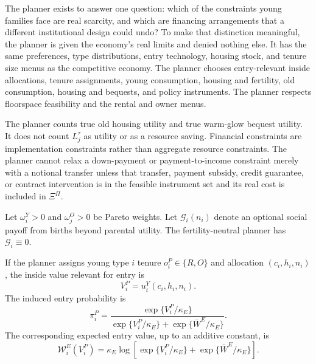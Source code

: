 \documentclass[11pt]{article}
\newcommand{\1}{\mathbf 1}
\begin{document}
The planner exists to answer one question: which of the constraints young families face are real scarcity, and which are financing arrangements that a different institutional design could undo? To make that distinction meaningful, the planner is given the economy's real limits and denied nothing else. It has the same preferences, type distributions, entry technology, housing stock, and tenure size menus as the competitive economy. The planner chooses entry-relevant inside allocations, tenure assignments, young consumption, housing and fertility, old consumption, housing and bequests, and policy instruments. The planner respects floorspace feasibility and the rental and owner menus.

The planner counts true old housing utility and true warm-glow bequest utility. It does not count $L_j^\tau$ as utility or as a resource saving. Financial constraints are implementation constraints rather than aggregate resource constraints. The planner cannot relax a down-payment or payment-to-income constraint merely with a notional transfer unless that transfer, payment subsidy, credit guarantee, or contract intervention is in the feasible instrument set and its real cost is included in $\Xi^\Pi$.

Let $\omega_i^Y>0$ and $\omega_j^O>0$ be Pareto weights. Let $\mathcal G_i(n_i)$ denote an optional social payoff from births beyond parental utility. The fertility-neutral planner has $\mathcal G_i\equiv0$.

If the planner assigns young type $i$ tenure $o_i^P\in\{R,O\}$ and allocation $(c_i,h_i,n_i)$, the inside value relevant for entry is
\[
V_i^P=u_i^Y(c_i,h_i,n_i).
\]
The induced entry probability is
\[
\pi_i^P
=
\frac{
\exp\{V_i^P/\kappa_E\}
}{
\exp\{V_i^P/\kappa_E\}
+
\exp\{\bar W^E/\kappa_E\}
}.
\]
The corresponding expected entry value, up to an additive constant, is
\[
\mathcal W_i^E(V_i^P)
=
\kappa_E
\log
\left[
\exp\{V_i^P/\kappa_E\}
+
\exp\{\bar W^E/\kappa_E\}
\right].
\]
\end{document}
